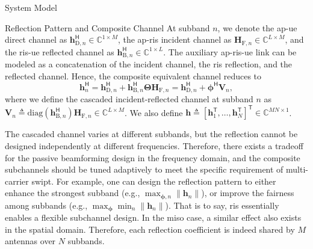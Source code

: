 \begin{section}{System Model}
\begin{subsection}{Reflection Pattern and Composite Channel}
		At subband $n$, we denote the \gls{ap}-\gls{ue} direct channel as $\mathbf{h}_{\mathrm{D},n}^\mathsf{H} \in \mathbb{C}^{1 \times M}$, the \gls{ap}-\gls{ris} incident channel as $\mathbf{H}_{\mathrm{F},n} \in \mathbb{C}^{L \times M}$, and the \gls{ris}-\gls{ue} reflected channel as $\mathbf{h}_{\mathrm{B},n}^\mathsf{H} \in \mathbb{C}^{1 \times L}$. The auxiliary \gls{ap}-\gls{ris}-\gls{ue} link can be modeled as a concatenation of the incident channel, the \gls{ris} reflection, and the reflected channel. Hence, the composite equivalent channel reduces to
		\begin{equation}\label{eq:h_n}
			\mathbf{h}_{n}^\mathsf{H} = \mathbf{h}_{\mathrm{D},n}^\mathsf{H} + \mathbf{h}_{\mathrm{B},n}^\mathsf{H} \mathbf{\Theta} \mathbf{H}_{\mathrm{F},n} = \mathbf{h}_{\mathrm{D},n}^\mathsf{H} + \mathbf{\phi}^\mathsf{H} \mathbf{V}_{n},
		\end{equation}
		where we define the cascaded incident-reflected channel at subband $n$ as $\mathbf{V}_{n} \triangleq \mathrm{diag}(\mathbf{h}_{\mathrm{B},n}^\mathsf{H})\mathbf{H}_{\mathrm{F},n} \in \mathbb{C}^{L \times M}$. We also define $\mathbf{h} \triangleq [\mathbf{h}_1^\mathsf{T},\dots,\mathbf{h}_N^\mathsf{T}]^\mathsf{T} \in \mathbb{C}^{MN \times 1}$.

		\begin{remark}\label{re:subband_tradeoff}
			The cascaded channel varies at different subbands, but the reflection cannot be designed independently at different frequencies. Therefore, there exists a tradeoff for the passive beamforming design in the frequency domain, and the composite subchannels should be tuned adaptively to meet the specific requirement of multi-carrier \gls{swipt}. For example, one can design the reflection pattern to either enhance the strongest subband (e.g., $\max_{\mathbf{\phi},n} \lVert \mathbf{h}_n \rVert$), or improve the fairness among subbands (e.g., $\max_{\mathbf{\phi}} \min_n \lVert \mathbf{h}_n \rVert$). That is to say, \gls{ris} essentially enables a flexible subchannel design. In the \gls{miso} case, a similar effect also exists in the spatial domain. Therefore, each reflection coefficient is indeed shared by $M$ antennas over $N$ subbands.
		\end{remark}
	\end{subsection}



\end{section}
